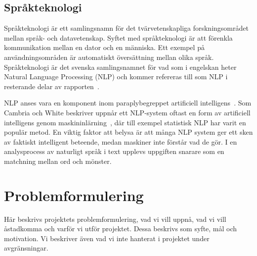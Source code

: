 \documentclass[a4paper,12pt]{article}
\begin{document}
\subsection{Språkteknologi}
\label{sec:sprakteknologi}
Språkteknologi är ett samlingsnamn för det tvärvetenskapliga forskningsområdet mellan språk- och datavetenskap. Syftet med språkteknologi är att förenkla kommunikation mellan en dator och en människa. Ett exempel på användningsområden är automatiskt översättning mellan olika språk. Språkteknologi är det svenska samlingsnamnet för vad som i engelskan heter Natural Language Processing (NLP) och kommer refereras till som NLP i resterande delar av rapporten~\cite{web:sprakteknologi}.

NLP anses vara en komponent inom  paraplybegreppet artificiell intelligens~\cite{web:5AI}. Som Cambria och White  beskriver uppnår ett NLP-system oftast en form av artificiell intelligens genom maskininlärning~\cite{web:NLPcurves}, där till exempel statistisk NLP har varit en populär metod. En viktig faktor att belysa är att många NLP system ger ett sken av faktiskt intelligent beteende, medan maskiner inte förstår vad de gör. I en analysprocess av naturligt språk i text upplevs uppgiften snarare som en matchning mellan ord och mönster. 



\section{Problemformulering}\label{sec:syfte}
Här beskrivs projektets problemformulering, vad vi vill uppnå, vad vi vill åstadkomma och varför vi utför projektet. Dessa beskrivs som syfte, mål och motivation. Vi beskriver även vad vi inte hanterat i projektet under avgränsningar.
\end{document}
